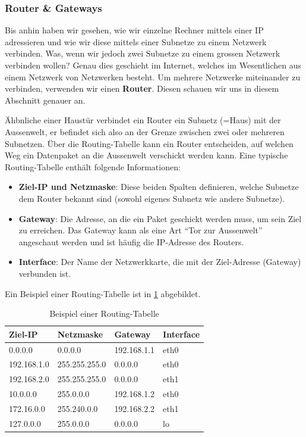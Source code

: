 \subsubsection{Router \& Gateways}

Bis anhin haben wir gesehen, wie wir einzelne Rechner mittels einer IP adressieren und wie wir diese mittels einer Subnetze zu einem Netzwerk verbinden. Was, wenn wir jedoch zwei Subnetze zu einem grossen Netzwerk verbinden wollen? Genau dies geschieht im Internet, welches im Wesentlichen aus einem Netzwerk von Netzwerken besteht. Um mehrere Netzwerke miteinander zu verbinden, verwenden wir einen \textbf{Router}. Diesen schauen wir uns in diesem Abschnitt genauer an.

Ähbnliche einer Haustür verbindet ein Router ein Subnetz (=Haus) mit der Aussenwelt, er befindet sich also an der Grenze zwischen zwei oder mehreren Subnetzen. Über die Routing-Tabelle kann ein Router entscheiden, auf welchen Weg ein Datenpaket an die Aussenwelt verschickt werden kann. Eine typische Routing-Tabelle enthält folgende Informationen:

\begin{itemize}
\item \textbf{Ziel-IP und Netzmaske}: Diese beiden Spalten definieren, welche Subnetze dem Router bekannt sind (sowohl eigenes Subnetz wie andere Subnetze).
\item \textbf{Gateway}: Die Adresse, an die ein Paket geschickt werden muss, um sein Ziel zu erreichen. Das Gateway kann als eine Art ``Tor zur Aussenwelt'' angeschaut werden und ist häufig die \gls{IP}-Adresse des Routers.
\item \textbf{Interface}: Der Name der Netzwerkkarte, die mit der Ziel-Adresse (Gateway) verbunden ist. 
\end{itemize}

Ein Beispiel einer Routing-Tabelle ist in \cref{table:routing} abgebildet.

\begin{table}[H]
\centering
\begin{tabular}{ l | l || l | l}
\textbf{Ziel-IP} & \textbf{Netzmaske} & \textbf{Gateway} & \textbf{Interface} \\
\midrule\midrule
0.0.0.0 & 0.0.0.0 & 192.168.1.1 & eth0 \\
192.168.1.0 & 255.255.255.0 & 0.0.0.0 & eth0 \\
192.168.2.0 & 255.255.255.0 & 0.0.0.0 & eth1 \\
10.0.0.0 & 255.0.0.0 & 192.168.1.2 & eth0 \\
172.16.0.0 & 255.240.0.0 & 192.168.2.2 & eth1 \\
127.0.0.0 & 255.0.0.0 & 0.0.0.0 & lo \\
\end{tabular}
\caption{Beispiel einer Routing-Tabelle}
\label{table:routing}
\end{table}



